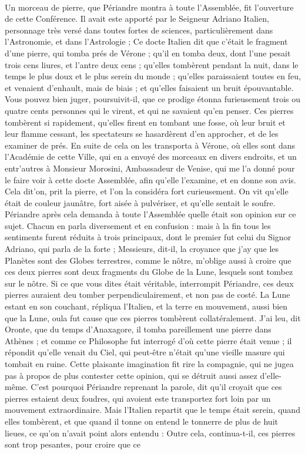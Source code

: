 \documentclass[a4paper, 11pt, oneside, polutonikogreek, french]{article}
\begin{document}
\paragraph{}
Un morceau de pierre, que Périandre montra à toute l'Assemblée, fit l'ouverture de cette Conférence. Il avait este apporté par le Seigneur Adriano Italien, personnage très versé dans toutes fortes de sciences, particulièrement dans l'Astronomie, et dans l'Astrologie ; Ce docte Italien dit que c'était le fragment d'une pierre, qui tomba prés de Vérone ; qu'il en tomba deux, dont l'une pesait trois cens liures, et l'antre deux cens ; qu'elles tombèrent pendant la nuit, dans le temps le plus doux et le plus serein du monde ; qu'elles paraissaient toutes en feu, et venaient d'enhault, mais de biais ; et qu'elles faisaient un bruit épouvantable. Vous pouvez bien juger, poursuivit-il, que ce prodige étonna furieusement trois ou quatre cents personnes qui le virent, et qui ne savaient qu'en penser. Ces pierres tombèrent si rapidement, qu'elles firent en tombant une fosse, où leur bruit et leur flamme cessant, les spectateurs se hasardèrent d'en approcher, et de les examiner de prés. En suite de cela on les transporta à Vérone, où elles sont dans l'Académie de cette Ville, qui en a envoyé des morceaux en divers endroits, et un entr'autres à Monsieur Morosini, Ambassadeur de Venise, qui me l'a donné pour le faire voir à cette docte Assemblée, afin qu'elle l'examine, et en donne son avis. Cela dit'on, prit la pierre, et l'on la considéra fort curieusement. On vit qu'elle était de couleur jaunâtre, fort aisée à pulvériser, et qu'elle sentait le soufre. Périandre après cela demanda à toute l'Assemblée quelle était son opinion sur ce sujet. Chacun en parla diversement et en confusion : mais à la fin tous les sentiments furent réduits à trois principaux, dont le premier fut celui du Signor Adriano, qui parla de la forte ; Messieurs, dit-il, la croyance que j'ay que les Planètes sont des Globes terrestres, comme le nôtre, m'oblige aussi à croire que ces deux pierres sont deux fragments du Globe de la Lune, lesquels sont tombez sur le nôtre. Si ce que vous dites était véritable, interrompit Périandre, ces deux pierres auraient deu tomber perpendiculairement, et non pas de costé. La Lune estant en son couchant, répliqua l'Italien, et la terre en mouvement, aussi bien que la Lune, oula fut cause que ces pierres tombèrent collatéralement. J'ai leu, dit Oronte, que du temps d'Anaxagore, il tomba pareillement une pierre dans Athènes ; et comme ce Philosophe fut interrogé d'où cette pierre était venue ; il répondit qu'elle venait du Ciel, qui peut-être n'était qu'une vieille masure qui tombait en ruine. Cette plaisante imagination fit rire la compagnie, qui ne jugea pas à propos de plus contester cette opinion, qui se détruit aussi assez d'elle-même. C'est pourquoi Périandre reprenant la parole, dit qu'il croyait que ces pierres estaient deux foudres, qui avoient este transportez fort loin par un mouvement extraordinaire. Mais l'Italien repartit que le temps était serein, quand elles tombèrent, et que quand il tonne on entend le tonnerre de plus de huit lieues, ce qu'on n'avait point alors entendu : Outre cela, continua-t-il, ces pierres sont trop pesantes, pour croire que ce 
\end{document}
